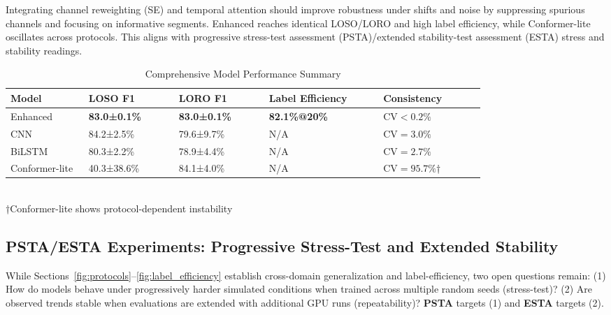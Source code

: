 \documentclass[journal]{IEEEtran}
\begin{document}
Integrating channel reweighting (SE) and temporal attention should improve robustness under shifts and noise by suppressing spurious channels and focusing on informative segments. 
Enhanced reaches identical LOSO/LORO and high label efficiency, while Conformer-lite oscillates across protocols. This aligns with progressive stress-test assessment (PSTA)/extended stability-test assessment (ESTA) stress and stability readings.


\begin{table}[ht]
\centering
\caption{Comprehensive Model Performance Summary}
\begin{tabular}{p{0.13\linewidth} p{0.15\linewidth} p{0.15\linewidth} p{0.19\linewidth} p{0.17\linewidth}}
\toprule
Model & LOSO F1 & LORO F1 & Label Efficiency & Consistency \\
\midrule
Enhanced & \textbf{83.0±0.1\%} & \textbf{83.0±0.1\%} & \textbf{82.1\%@20\%} & \textbf{$\text{CV}<0.2\%$} \\
CNN & 84.2±2.5\% & 79.6±9.7\% & N/A & $\text{CV}=3.0\%$ \\
BiLSTM & 80.3±2.2\% & 78.9±4.4\% & N/A & $\text{CV}=2.7\%$ \\
Conformer-lite & 40.3±38.6\% & 84.1±4.0\% & N/A & $\text{CV}=95.7\%$† \\
\bottomrule
\end{tabular}\\
\footnotesize{†Conformer-lite shows protocol-dependent instability}
\label{tab:model_performance}
\end{table}

\subsection{PSTA/ESTA Experiments: Progressive Stress-Test and Extended Stability}

While Sections~\ref{fig:protocols}--\ref{fig:label_efficiency} establish cross-domain generalization and label-efficiency, two open questions remain: (1) How do models behave under progressively harder simulated conditions when trained across multiple random seeds (stress-test)? (2) Are observed trends stable when evaluations are extended with additional GPU runs (repeatability)? \textbf{PSTA} targets (1) and \textbf{ESTA} targets (2).
\end{document}
